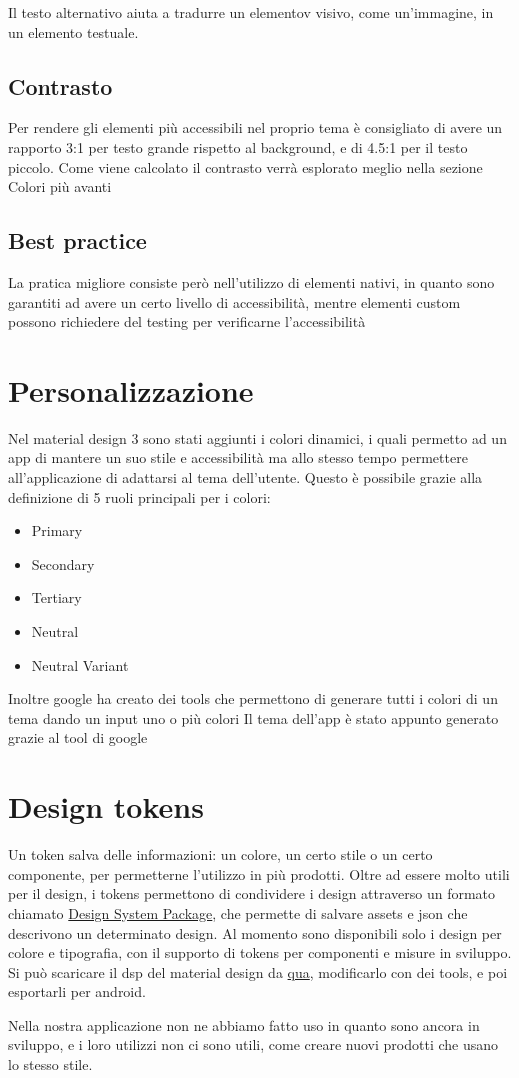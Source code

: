 \documentclass[12pt, a4paper]{report}
\begin{document}
			Il testo alternativo aiuta a tradurre un elementov visivo, come un'immagine, in un elemento testuale.
		\subsection{Contrasto}
			Per rendere gli elementi più accessibili nel proprio tema è consigliato di avere un rapporto 3:1 per testo grande rispetto al background, e di 4.5:1 per il testo piccolo. Come viene calcolato il contrasto verrà esplorato meglio nella sezione Colori più avanti

		\subsection{Best practice}
			La pratica migliore consiste però nell'utilizzo di elementi nativi, in quanto sono garantiti ad avere un certo livello di accessibilità, mentre elementi custom possono richiedere del testing per verificarne l'accessibilità
	\section{Personalizzazione}
		Nel material design 3 sono stati aggiunti i colori dinamici, i quali permetto ad un app di mantere un suo stile e accessibilità ma allo stesso tempo permettere all'applicazione di adattarsi al tema dell'utente.
		Questo è possibile grazie alla definizione di 5 ruoli principali per i colori:
		\begin{itemize}
			\item Primary
			\item Secondary
			\item Tertiary
			\item Neutral
			\item Neutral Variant
		\end{itemize}
		Inoltre google ha creato dei tools che permettono di generare tutti i colori di un tema dando un input uno o più colori
		Il tema dell'app è stato appunto generato grazie al tool di google
		
	\section{Design tokens}
		Un token salva delle informazioni: un colore, un certo stile o un certo componente, per permetterne l'utilizzo in più prodotti.
		Oltre ad essere molto utili per il design, i tokens permettono di condividere i design attraverso un formato chiamato \href{https://github.com/AdobeXD/design-system-package-dsp}{Design System Package},
		che permette di salvare assets e json che descrivono un determinato design.
		Al momento sono disponibili solo i design per colore e tipografia, con il supporto di tokens per componenti e misure in sviluppo. Si può scaricare il dsp del material design da \href{https://github.com/material-foundation/material-tokens}{qua}, modificarlo con dei tools, e poi esportarli per android.
		
		Nella nostra applicazione non ne abbiamo fatto uso in quanto sono ancora in sviluppo, e i loro utilizzi non ci sono utili, come creare nuovi prodotti che usano lo stesso stile.
	

\printbibliography
\end{document}
